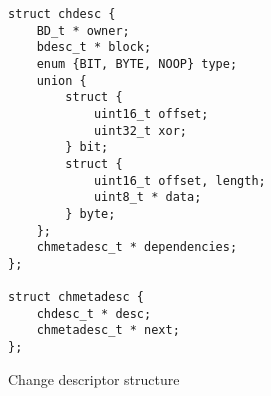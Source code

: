 \begin{figure}
\begin{verbatim}
struct chdesc {
    BD_t * owner;
    bdesc_t * block;
    enum {BIT, BYTE, NOOP} type;
    union {
        struct {
            uint16_t offset;
            uint32_t xor;
        } bit;
        struct {
            uint16_t offset, length;
            uint8_t * data;
        } byte;
    };
    chmetadesc_t * dependencies;
};

struct chmetadesc {
    chdesc_t * desc;
    chmetadesc_t * next;
};
\end{verbatim}
\caption{\label{fig:chdesc} Change descriptor structure}
\end{figure}